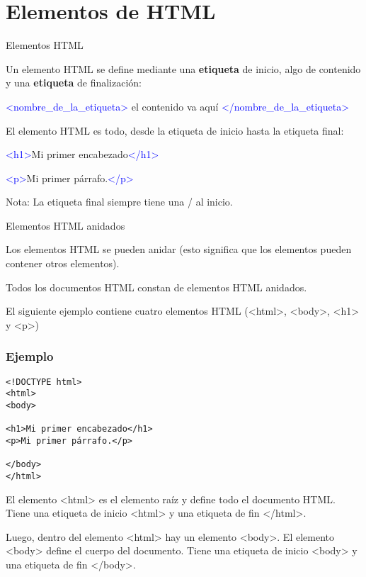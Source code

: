 
\section{Elementos de HTML}

\begin{frame}[c]{Elementos HTML}

  Un elemento HTML se define mediante una \textbf{etiqueta} de inicio,
  algo de contenido y una \textbf{etiqueta} de finalización:

  \vspace{\baselineskip}
  \textcolor{blue}{<nombre\_de\_la\_etiqueta>} el contenido va aquí
  \textcolor{blue}{</nombre\_de\_la\_etiqueta>}

  \pausa
  \vspace{\baselineskip}
  El elemento HTML es todo, desde la etiqueta de inicio hasta la
  etiqueta final:

  \vspace{\baselineskip}
  \textcolor{blue}{<h1>}Mi primer encabezado\textcolor{blue}{</h1>}

  \vspace{\baselineskip}
  \textcolor{blue}{<p>}Mi primer párrafo.\textcolor{blue}{</p>}

  \begin{exampleblock}{Nota:}
    La etiqueta final siempre tiene una / al inicio.
  \end{exampleblock}
\end{frame}


\begin{frame}[c]{Elementos HTML anidados}

  Los elementos HTML se pueden anidar (esto significa que los
  elementos pueden contener otros elementos).

  \vspace{\baselineskip}
  Todos los documentos HTML constan de elementos HTML anidados.

  \vspace{\baselineskip}
  El siguiente ejemplo contiene cuatro elementos HTML (<html>, <body>,
  <h1> y <p>)
\end{frame}

\begin{frame}[fragile]
  \frametitle{Ejemplo}

  \begin{lstlisting}
<!DOCTYPE html>
<html>
<body>

<h1>Mi primer encabezado</h1>
<p>Mi primer párrafo.</p>

</body>
</html>
  \end{lstlisting}

  El elemento <html> es el elemento raíz y define todo el documento HTML.
  Tiene una etiqueta de inicio <html> y una etiqueta de fin </html>.

  \vspace{\baselineskip}
  Luego, dentro del elemento <html> hay un elemento <body>.
  El elemento <body> define el cuerpo del documento.
  Tiene una etiqueta de inicio <body> y una etiqueta de fin </body>.

\end{frame}

